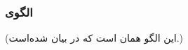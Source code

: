 \subsubsection{الگوی }
\label{resourceOrderedLockSec}
\begin{RTL}
(این الگو همان  است که
در \cite{ref1} بیان شده‌است.)
\end{RTL}